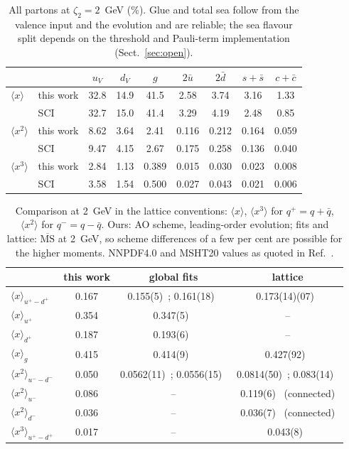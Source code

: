 \documentclass[11pt,a4paper]{article}
\newcommand{\mom}[1]{\langle #1\rangle}
\begin{document}
\begin{table}[H]
\centering\small
\begin{tabular}{llccccccc}
\toprule
 & & $u_V$ & $d_V$ & $g$ & $2\bar u$ & $2\bar d$ & $s+\bar s$ & $c+\bar c$\\
\midrule
$\mom{x}$ & this work & 32.8 & 14.9 & 41.5 & 2.58 & 3.74 & 3.16 & 1.33\\
 & SCI~\cite{Yu:2025sci} & 32.7 & 15.0 & 41.4 & 3.29 & 4.19 & 2.48 & 0.85\\
$\mom{x^2}$ & this work & 8.62 & 3.64 & 2.41 & 0.116 & 0.212 & 0.164 & 0.059\\
 & SCI & 9.47 & 4.15 & 2.67 & 0.175 & 0.258 & 0.136 & 0.040\\
$\mom{x^3}$ & this work & 2.84 & 1.13 & 0.389 & 0.015 & 0.030 & 0.023 & 0.008\\
 & SCI & 3.58 & 1.54 & 0.500 & 0.027 & 0.043 & 0.021 & 0.006\\
\bottomrule
\end{tabular}
\caption{All partons at $\zeta_2 = 2$~GeV (\%). Glue and total sea follow from the valence input and the evolution and
are reliable; the sea flavour split depends on the threshold and Pauli-term implementation (Sect.~\ref{sec:open}).}
\end{table}

\begin{table}[H]
\centering\small
\begin{tabular}{lccc}
\toprule
 & this work & global fits & lattice\\
\midrule
$\mom{x}_{u^+-d^+}$ & 0.167 & 0.155(5)~\cite{Butterworth:2015oua}; 0.161(18)~\cite{Lin:2017snn} & 0.173(14)(07)~\cite{Mondal:2020cmt}\\
$\mom{x}_{u^+}$ & 0.354 & 0.347(5)~\cite{Lin:2017snn} & --\\
$\mom{x}_{d^+}$ & 0.187 & 0.193(6)~\cite{Lin:2017snn} & --\\
$\mom{x}_{g}$ & 0.415 & 0.414(9)~\cite{Lin:2017snn} & 0.427(92)~\cite{Alexandrou:2020sml}\\
$\mom{x^2}_{u^--d^-}$ & 0.050 & 0.0562(11)~\cite{Ball:2021leu}; 0.0556(15)~\cite{Bailey:2020ooq} & 0.0814(50)~\cite{Alexandrou:2026gff}; 0.083(14)~\cite{Taggi:2026}\\
$\mom{x^2}_{u^-}$ & 0.086 & -- & 0.119(6)~\cite{Alexandrou:2026gff} (connected)\\
$\mom{x^2}_{d^-}$ & 0.036 & -- & 0.036(7)~\cite{Alexandrou:2026gff} (connected)\\
$\mom{x^3}_{u^+-d^+}$ & 0.017 & -- & 0.043(8)~\cite{Alexandrou:2026gff}\\
\bottomrule
\end{tabular}
\caption{Comparison at 2~GeV in the lattice conventions: $\mom{x}$, $\mom{x^3}$ for $q^+ = q + \bar q$,
$\mom{x^2}$ for $q^- = q - \bar q$. Ours: AO scheme, leading-order evolution; fits and lattice:
$\overline{\text{MS}}$ at 2~GeV, so scheme differences of a few per cent are possible for the higher moments.
NNPDF4.0 and MSHT20 values as quoted in Ref.~\cite{Taggi:2026}.}
\end{table}
\end{document}
